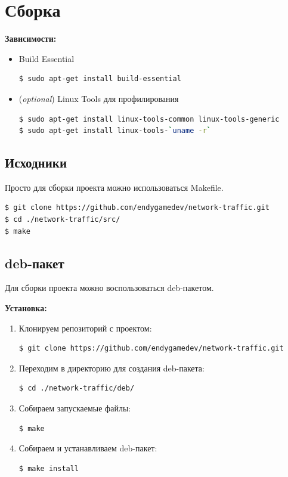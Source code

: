 \section{Сборка}


\textbf{Зависимости:}
\begin{itemize}
\item Build Essential
\begin{lstlisting}[language=bash]
$ sudo apt-get install build-essential
\end{lstlisting}

\item (\textit{optional}) Linux Tools для профилирования
\begin{lstlisting}[language=bash]
$ sudo apt-get install linux-tools-common linux-tools-generic
$ sudo apt-get install linux-tools-`uname -r`
\end{lstlisting}
\end{itemize}


\subsection{Исходники}

Просто для сборки проекта можно использоваться Makefile.
\begin{lstlisting}[language=bash]
$ git clone https://github.com/endygamedev/network-traffic.git
$ cd ./network-traffic/src/
$ make
\end{lstlisting}


\subsection{deb-пакет}

Для сборки проекта можно воспользоваться deb-пакетом.

\textbf{Установка:}
\begin{enumerate}
\item Клонируем репозиторий с проектом:
\begin{lstlisting}[language=bash]
$ git clone https://github.com/endygamedev/network-traffic.git
\end{lstlisting}

\item Переходим в директорию для создания deb-пакета:
\begin{lstlisting}[language=bash]
$ cd ./network-traffic/deb/
\end{lstlisting}

\item Собираем запускаемые файлы:
\begin{lstlisting}[language=bash]
$ make
\end{lstlisting}

\item Собираем и устанавливаем deb-пакет:
\begin{lstlisting}[language=bash]
$ make install
\end{lstlisting}
\end{enumerate}

